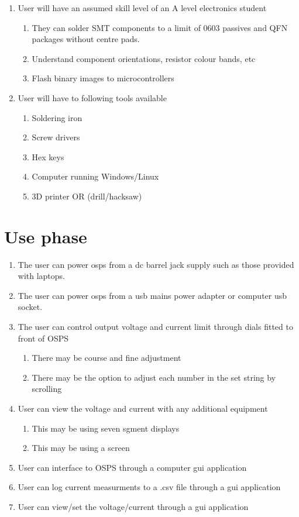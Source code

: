 \documentclass[12pt,a4paper]{article}
\begin{document}
\begin{enumerate}[label*=\arabic*.]
\begin{enumerate}[label*=\arabic*.]
\begin{enumerate}[label*=\arabic*.]
		\end{enumerate}
	\end{enumerate}
\item User will have an assumed skill level of an A level electronics student
		\begin{enumerate}[label*=\arabic*.]
		\item They can solder SMT components to a limit of 0603 passives and QFN packages without centre pads. 
		\item Understand component orientations, resistor colour bands, etc
		\item Flash binary images to microcontrollers
		\end{enumerate}
\item User will have to following tools available
		\begin{enumerate}[label*=\arabic*.]
		\item Soldering iron
		\item Screw drivers
		\item Hex keys
		\item Computer running Windows/Linux
		\item 3D printer OR (drill/hacksaw) 
		\end{enumerate}
\end{enumerate}


\section{Use phase}
\begin{enumerate}
\item The user can power \gls{osps} from a \gls{dc} barrel jack supply such as those provided with laptops.
\item The user can power \gls{osps} from a \gls{usb} mains power adapter  or computer \gls{usb} socket.
\item The user can control output voltage and current limit through dials fitted to front of OSPS
	\begin{enumerate}[label*=\arabic*.]
	\item There may be  course and fine adjustment 
	\item There may be the option to adjust each number in the set string by scrolling 
	\end{enumerate}
\item User can view the voltage and current with any additional equipment
	\begin{enumerate}[label*=\arabic*.]
	\item This may be using seven sgment displays
	\item This may be using a screen
	\end{enumerate}
\item User can interface to OSPS through a computer \gls{gui} application
\item User can log current measurments to a .csv file through a \gls{gui} application
\item User can view/set the voltage/current through a \gls{gui} application
\end{enumerate}
\end{document}
